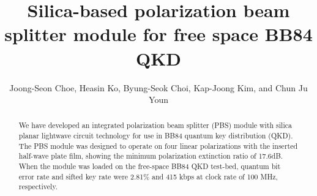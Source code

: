 \documentclass[letterpaper, 10pt]{article}
\begin{document}
\title{Silica-based polarization beam splitter module for free space BB84 QKD}
\author{Joong-Seon Choe, Heasin Ko, Byung-Seok Choi, Kap-Joong Kim, and Chun Ju Youn}
\address{Electronics and Telecommunications Research Institute, Daejeon 34129, Korea}
\begin{abstract}
We have developed an integrated polarization beam splitter (PBS) module with silica planar lightwave circuit technology for use in BB84 quantum key distribution (QKD).
The PBS module was designed to operate on four linear polarizations with the inserted half-wave plate film, showing the minimum polarization extinction ratio of 17.6dB.
When the module was loaded on the free-space BB84 QKD test-bed, quantum bit error rate and sifted key rate  were 2.81\% and 415 kbps at clock rate of 100 MHz, respectively.
\end{abstract}





\end{document}
